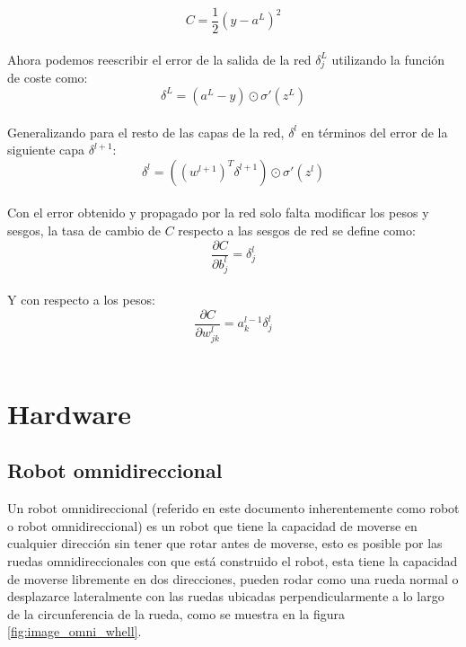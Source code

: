 \documentclass{iccmemoria}
\begin{document}
\begin{equation}
	C = \frac{1}{2} (y-a^L )^2
\end{equation}\\

Ahora podemos reescribir el error de la salida de la red $\delta^L_j$ utilizando la función de coste como:\\

\begin{equation}
	\delta^L = (a^L-y) \odot \sigma'(z^L)
\end{equation}\\

Generalizando para el resto de las capas de la red, $\delta^l$ en términos del error de la siguiente capa $\delta^{l+1}$:\\

\begin{equation}
	\delta^l = ((w^{l+1})^T \delta^{l+1}) \odot \sigma'(z^l)
\end{equation}\\

Con el error obtenido y propagado por la red solo falta modificar los pesos y sesgos, la tasa de cambio de $C$ respecto a las sesgos de red se define como:\\

\begin{equation}
	\frac{\partial C}{\partial b^l_j} =
  \delta^l_j
\end{equation}\\

Y con respecto a los pesos:\\

\begin{equation}
	\frac{\partial C}{\partial w^l_{jk}} = a^{l-1}_k \delta^l_j
\end{equation}\\

\section{Hardware}

\subsection{Robot omnidireccional}

Un robot omnidireccional (referido en este documento inherentemente como robot o robot omnidireccional) es un robot que tiene la capacidad de moverse en cualquier dirección sin tener que rotar antes de moverse, esto es posible por las ruedas omnidireccionales con que está construido el robot, esta tiene la capacidad de moverse libremente en dos direcciones, pueden rodar como una rueda normal o desplazarce lateralmente con las ruedas ubicadas perpendicularmente a lo largo de la circunferencia de la rueda, como se muestra en la figura \ref{fig:image_omni_whell}.\\
\end{document}
